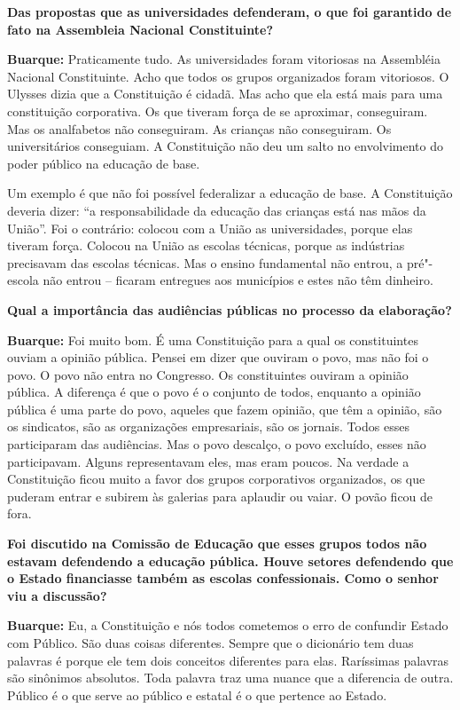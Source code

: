 \textbf{Das propostas que as universidades defenderam, o que foi
garantido de fato na Assembleia Nacional Constituinte?}

\textbf{Buarque:} Praticamente tudo. As universidades foram vitoriosas
na Assembléia Nacional Constituinte. Acho que todos os grupos
organizados foram vitoriosos. O Ulysses dizia que a Constituição é
cidadã. Mas acho que ela está mais para uma constituição corporativa. Os
que tiveram força de se aproximar, conseguiram. Mas os analfabetos não
conseguiram. As crianças não conseguiram. Os universitários conseguiam.
A Constituição não deu um salto no envolvimento do poder público na
educação de base.

Um exemplo é que não foi possível federalizar a educação de base. A
Constituição deveria dizer: ``a responsabilidade da educação das
crianças está nas mãos da União''. Foi o contrário: colocou com a União
as universidades, porque elas tiveram força. Colocou na União as escolas
técnicas, porque as indústrias precisavam das escolas técnicas. Mas o
ensino fundamental não entrou, a pré"-escola não entrou -- ficaram
entregues aos municípios e estes não têm dinheiro.

\textbf{Qual a importância das audiências públicas no processo da
elaboração?}

\textbf{Buarque:} Foi muito bom. É uma Constituição para a qual os
constituintes ouviam a opinião pública. Pensei em dizer que ouviram o
povo, mas não foi o povo. O povo não entra no Congresso. Os
constituintes ouviram a opinião pública. A diferença é que o povo é o
conjunto de todos, enquanto a opinião pública é uma parte do povo,
aqueles que fazem opinião, que têm a opinião, são os sindicatos, são as
organizações empresariais, são os jornais. Todos esses participaram das
audiências. Mas o povo descalço, o povo excluído, esses não
participavam. Alguns representavam eles, mas eram poucos. Na verdade a
Constituição ficou muito a favor dos grupos corporativos organizados, os
que puderam entrar e subirem às galerias para aplaudir ou vaiar. O povão
ficou de fora.

\textbf{Foi discutido na Comissão de Educação que esses grupos todos não
estavam defendendo a educação pública. Houve setores defendendo que o
Estado financiasse também as escolas confessionais. Como o senhor viu a
discussão?}

\textbf{Buarque:} Eu, a Constituição e nós todos cometemos o erro de
confundir Estado com Público. São duas coisas diferentes. Sempre que o
dicionário tem duas palavras é porque ele tem dois conceitos diferentes
para elas. Raríssimas palavras são sinônimos absolutos. Toda palavra
traz uma nuance que a diferencia de outra. Público é o que serve ao
público e estatal é o que pertence ao Estado.


